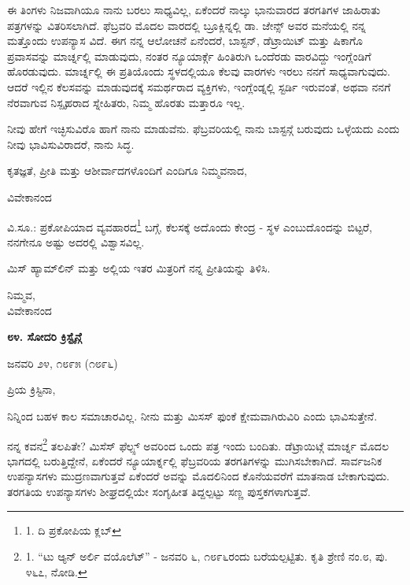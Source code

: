 ಈ ತಿಂಗಳು ನಿಜವಾಗಿಯೂ ನಾನು ಬರಲು ಸಾಧ್ಯವಿಲ್ಲ, ಏಕೆಂದರೆ ನಾಲ್ಕು ಭಾನುವಾರದ ತರಗತಿಗಳ ಜಾಹಿರಾತು ಪತ್ರಗಳನ್ನು ವಿತರಿಸಲಾಗಿದೆ. ಫೆಬ್ರವರಿ ಮೊದಲ ವಾರದಲ್ಲಿ ಬ್ರೂಕ್ಲಿನ್ನಲ್ಲಿ ಡಾ. ಜೇನ್ಸ್ ಅವರ ಮನೆಯಲ್ಲಿ ನನ್ನ ಮತ್ತೊಂದು ಉಪನ್ಯಾಸ ವಿದೆ. ಈಗ ನನ್ನ ಆಲೋಚನೆ ಏನೆಂದರೆ, ಬಾಸ್ಟನ್, ಡೆಟ್ರಾಯಿಟ್ ಮತ್ತು ಷಿಕಾಗೊ ಪ್ರವಾಸವನ್ನು ಮಾರ್ಚ್ನಲ್ಲಿ ಮಾಡುವುದು, ನಂತರ ನ್ಯೂಯಾರ್ಕ್ಗೆ ಹಿಂತಿರುಗಿ ಒಂದೆರಡು ವಾರವಿದ್ದು ಇಂಗ್ಲೆಂಡಿಗೆ ಹೊರಡುವುದು. ಮಾರ್ಚ್ನಲ್ಲಿ ಈ ಪ್ರತಿಯೊಂದು ಸ್ಥಳದಲ್ಲಿಯೂ ಕೆಲವು ವಾರಗಳು ಇರಲು ನನಗೆ ಸಾಧ್ಯವಾಗುವುದು. ಆದರೆ ಇಲ್ಲಿನ ಕೆಲಸವನ್ನು ಮಾಡುವುದಕ್ಕೆ ಸಮರ್ಥರಾದ ವ್ಯಕ್ತಿಗಳು, ಇಂಗ್ಲೆಂಡ್ನಲ್ಲಿ ಸ್ಟರ್ಡಿ ಇರುವಂತೆ, ಅಥವಾ ನನಗೆ ನೆರವಾಗುವ ನಿಸ್ಪೃಹರಾದ ಸ್ನೇಹಿತರು, ನಿಮ್ಮ ಹೊರತು ಮತ್ತಾರೂ ಇಲ್ಲ.

ನೀವು ಹೇಗೆ ಇಚ್ಛಿಸುವಿರೊ ಹಾಗೆ ನಾನು ಮಾಡುವೆನು. ಫೆಬ್ರವರಿಯಲ್ಲಿ ನಾನು ಬಾಸ್ಟನ್ಗೆ ಬರುವುದು ಒಳ್ಳೆಯದು ಎಂದು ನೀವು ಭಾವಿಸುವಿರಾದರೆ, ನಾನು ಸಿದ್ಧ.

ಕೃತಜ್ಞತೆ, ಪ್ರೀತಿ ಮತ್ತು ಆಶೀರ್ವಾದಗಳೊಂದಿಗೆ ಎಂದಿಗೂ ನಿಮ್ಮವನಾದ,

\begin{flushright}
ವಿವೇಕಾನಂದ
\end{flushright}

ವಿ.ಸೂ.: ಪ್ರಕೋಪಿಯಾದ ವ್ಯವಹಾರದ\footnote{1. ದಿ ಪ್ರಕೋಪಿಯ ಕ್ಲಬ್} ಬಗ್ಗೆ, ಕೆಲಸಕ್ಕೆ ಅದೊಂದು ಕೇಂದ್ರ - ಸ್ಥಳ ಎಂಬುದೊಂದನ್ನು ಬಿಟ್ಟರೆ, ನನಗೇನೂ ಅಷ್ಟು ಅದರಲ್ಲಿ ವಿಶ್ವಾಸವಿಲ್ಲ.

ಮಿಸ್ ಹ್ಯಾಮ್​ಲಿನ್ ಮತ್ತು ಅಲ್ಲಿಯ ಇತರ ಮಿತ್ರರಿಗೆ ನನ್ನ ಪ್ರೀತಿಯನ್ನು ತಿಳಿಸಿ.

\begin{flushright}
ನಿಮ್ಮವ,\\ವಿವೇಕಾನಂದ
\end{flushright}

\begin{center}
\textbf{೮೪. ಸೋದರಿ ಕ್ರಿಸ್ಟೈನ್ಗೆ}
\end{center}

\begin{flushright}
ಜನವರಿ ೨೪, ೧೮೯೫ (೧೮೯೬)
\end{flushright}

ಪ್ರಿಯ ಕ್ರಿಸ್ಟಿನಾ,

ನಿನ್ನಿಂದ ಬಹಳ ಕಾಲ ಸಮಾಚಾರವಿಲ್ಲ. ನೀನು ಮತ್ತು ಮಿಸಸ್ ಫುಂಕೆ ಕ್ಷೇಮವಾಗಿರುವಿರಿ ಎಂದು ಭಾವಿಸುತ್ತೇನೆ.

ನನ್ನ ಕವನ\footnote{1. “ಟು ಆ್ಯನ್ ಅರ್ಲಿ ವಯೊಲೆಟ್” - ಜನವರಿ ೬, ೧೮೯೬ರಂದು ಬರೆಯಲ್ಪಟ್ಟಿತು. ಕೃತಿ ಶ್ರೇಣಿ ನಂ.೮, ಪು. ೪೬೭, ನೋಡಿ.} ತಲಪಿತೇ? ಮಿಸೆಸ್ ಫೆಲ್ಪ್ಸ್ ಅವರಿಂದ ಒಂದು ಪತ್ರ ಇಂದು ಬಂದಿತು. ಡೆಟ್ರಾಯಿಟ್ಗೆ ಮಾರ್ಚ್ನ ಮೊದಲ ಭಾಗದಲ್ಲಿ ಬರುತ್ತಿದ್ದೇನೆ, ಏಕೆಂದರೆ ನ್ಯೂಯಾರ್ಕ್ನಲ್ಲಿ ಫೆಬ್ರವರಿಯ ತರಗತಿಗಳನ್ನು ಮುಗಿಸಬೇಕಾಗಿದೆ. ಸಾರ್ವಜನಿಕ ಉಪನ್ಯಾಸಗಳು ಮುದ್ರಣವಾಗುತ್ತವೆ ಏಕೆಂದರೆ ಅವನ್ನು ಮೊದಲಿನಿಂದ ಕೊನೆಯವರೆಗೆ ಮಾತನಾಡ ಬೇಕಾಗುವುದು. ತರಗತಿಯ ಉಪನ್ಯಾಸಗಳು ಶೀಘ್ರದಲ್ಲಿಯೇ ಸಂಗೃಹೀತ ತಿದ್ದಲ್ಪಟ್ಟು ಸಣ್ಣ ಪುಸ್ತಕಗಳಾಗುತ್ತವೆ.

